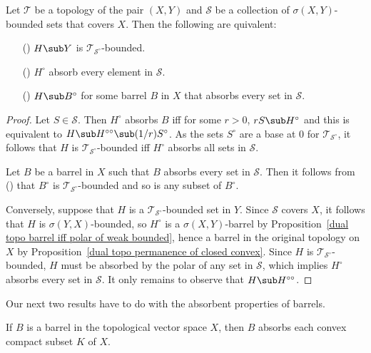 \begin{proposition}\label{polar topo bounded iff}
Let $\mathcal{T}$ be a topology of the pair $(X,Y)$ and $\mathcal{S}$ be a collection of $\sigma(X,Y)$-bounded sets that covers $X$. Then the following are quivalent:
\begin{itemize}
\item[(\rmnum{1})] $H\sub Y$ is $\mathcal{T}_{\mathcal{S}^\circ}$-bounded.
\item[(\rmnum{2})] $H^\circ$ absorb every element in $\mathcal{S}$.
\item[(\rmnum{3})] $H\sub B^\circ$ for some barrel $B$ in $X$ that absorbs every set in $\mathcal{S}$.
\end{itemize}
\end{proposition}
\begin{proof}
Let $S\in\mathcal{S}$. Then $H^\circ$ absorbs $B$ iff for some $r>0$, $rS\sub H^\circ$ and this is equivalent to $H\sub H^{\circ\circ}\sub(1/r)S^\circ$. As the sets $S^\circ$ are a base at $0$ for $\mathcal{T}_{\mathcal{S}^\circ}$, it follows that $H$ is $\mathcal{T}_{\mathcal{S}^\circ}$-bounded iff $H^\circ$ absorbs all sets in $\mathcal{S}$.\par
Let $B$ be a barrel in $X$ such that $B$ absorbs every set in $\mathcal{S}$. Then it follows from () that $B^\circ$ is $\mathcal{T}_{\mathcal{S}^\circ}$-bounded and so is any subset of $B^\circ$.\par
Conversely, suppose that $H$ is a $\mathcal{T}_{\mathcal{S}^\circ}$-bounded set in $Y$. Since $\mathcal{S}$ covers $X$, it follows that $H$ is $\sigma(Y,X)$-bounded, so $H^\circ$ is a $\sigma(X,Y)$-barrel by Proposition~\ref{dual topo barrel iff polar of weak bounded}, hence a barrel in the original topology on $X$ by Proposition~\ref{dual topo permanence of closed convex}. Since $H$ is $\mathcal{T}_{\mathcal{S}^\circ}$-bounded, $H$ must be absorbed by the polar of any set in $\mathcal{S}$, which implies $H^\circ$ absorbs every set in $\mathcal{S}$. It only remains to observe that $H\sub H^{\circ\circ}$.
\end{proof}
Our next two results have to do with the absorbent properties of barrels.
\begin{proposition}\label{barrel absorb convex compact}
If $B$ is a barrel in the topological vector space $X$, then $B$ absorbs each convex compact subset $K$ of $X$.
\end{proposition}
